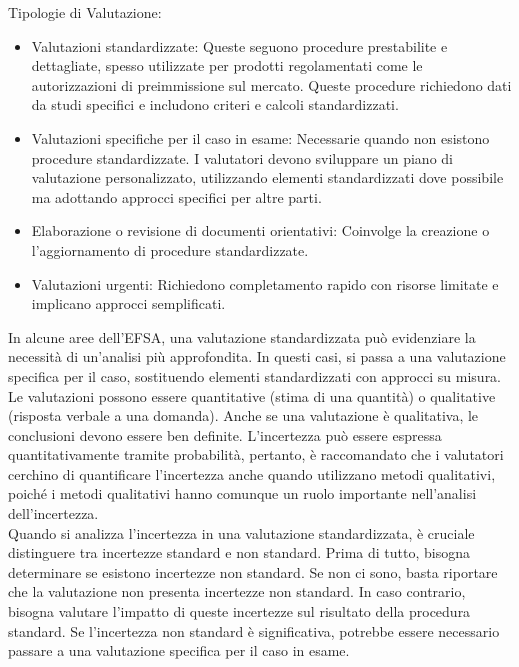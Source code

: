 \noindent Tipologie di Valutazione:
\begin{itemize}
    \item Valutazioni standardizzate: Queste seguono procedure prestabilite e dettagliate, spesso utilizzate per prodotti regolamentati come le autorizzazioni di preimmissione sul mercato. Queste procedure richiedono dati da studi specifici e includono criteri e calcoli standardizzati.
    \item  Valutazioni specifiche per il caso in esame: Necessarie quando non esistono procedure standardizzate. I valutatori devono sviluppare un piano di valutazione personalizzato, utilizzando elementi standardizzati dove possibile ma adottando approcci specifici per altre parti.
    \item  Elaborazione o revisione di documenti orientativi: Coinvolge la creazione o l'aggiornamento di procedure standardizzate.
    \item  Valutazioni urgenti: Richiedono completamento rapido con risorse limitate e implicano approcci semplificati.
    
\end{itemize}

In alcune aree dell'EFSA, una valutazione standardizzata può evidenziare la necessità di un'analisi più approfondita. In questi casi, si passa a una valutazione specifica per il caso, sostituendo elementi standardizzati con approcci su misura.\\
Le valutazioni possono essere quantitative (stima di una quantità) o qualitative (risposta verbale a una domanda). Anche se una valutazione è qualitativa, le conclusioni devono essere ben definite. L'incertezza può essere espressa quantitativamente tramite probabilità, pertanto, è raccomandato che i valutatori cerchino di quantificare l'incertezza anche quando utilizzano metodi qualitativi, poiché i metodi qualitativi hanno comunque un ruolo importante nell'analisi dell'incertezza.\\

Quando si analizza l'incertezza in una valutazione standardizzata, è cruciale distinguere tra incertezze standard e non standard. Prima di tutto, bisogna determinare se esistono incertezze non standard. Se non ci sono, basta riportare che la valutazione non presenta incertezze non standard. In caso contrario, bisogna valutare l'impatto di queste incertezze sul risultato della procedura standard. Se l'incertezza non standard è significativa, potrebbe essere necessario passare a una valutazione specifica per il caso in esame.\\

